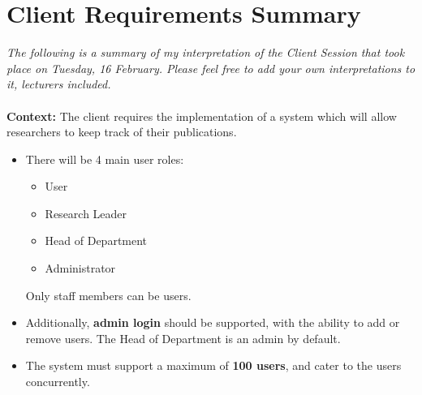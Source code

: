 \documentclass[a4paper,12pt]{article}
\begin{document}
\section{Client Requirements Summary}

\textit{The following is a summary of my interpretation of the Client Session that took place on Tuesday, 16 February. Please feel free to add your own interpretations to it, lecturers included.}\\
\\
\textbf{Context: } The client requires the implementation of a system which will allow researchers to keep track of their publications. 

\begin{itemize}

\item There will be 4 main user roles:
\begin{itemize}
\item User
\item Research Leader
\item Head of Department
\item Administrator
\end{itemize}
Only staff members can be users.

\item Additionally, \textbf{admin login} should be supported, with the ability to add or remove users. The Head of Department is an admin by default.

\item The system must support a maximum of \textbf{100 users}, and cater to the users concurrently.


\end{itemize}
\end{document}
